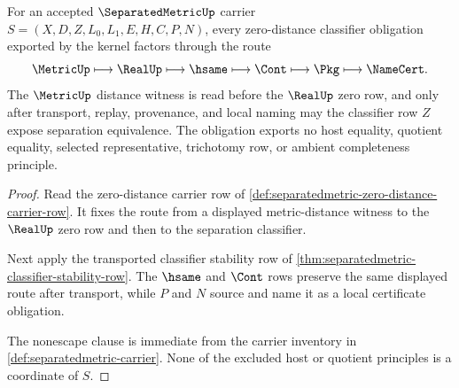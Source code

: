 \begin{theorem}
\label{thm:separatedmetric-kernel-zero-distance-obligation}
For an accepted $\SeparatedMetricUp$ carrier $S=(X,D,Z,L_0,L_1,E,H,C,P,N)$, every zero-distance classifier obligation exported by the kernel factors through the route
$$
\MetricUp \longmapsto \RealUp \longmapsto \hsame \longmapsto \Cont \longmapsto \Pkg \longmapsto \NameCert .
$$
The $\MetricUp$ distance witness is read before the $\RealUp$ zero row, and only after transport, replay, provenance, and local naming may the classifier row $Z$ expose separation equivalence. The obligation exports no host equality, quotient equality, selected representative, trichotomy row, or ambient completeness principle.
\end{theorem}
\begin{proof}
Read the zero-distance carrier row of \autoref{def:separatedmetric-zero-distance-carrier-row}. It fixes the route from a displayed metric-distance witness to the $\RealUp$ zero row and then to the separation classifier.

Next apply the transported classifier stability row of \autoref{thm:separatedmetric-classifier-stability-row}. The $\hsame$ and $\Cont$ rows preserve the same displayed route after transport, while $P$ and $N$ source and name it as a local certificate obligation.

The nonescape clause is immediate from the carrier inventory in \autoref{def:separatedmetric-carrier}. None of the excluded host or quotient principles is a coordinate of $S$.
\end{proof}

